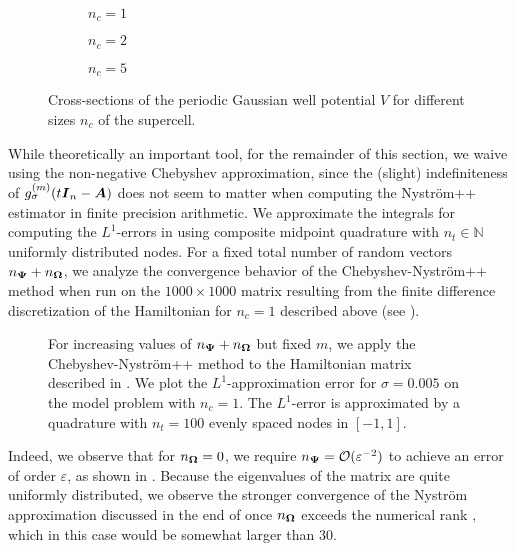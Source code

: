 \begin{figure}[ht]
    \begin{subfigure}[b]{0.32\columnwidth}
        
        \caption{$n_c=1$}
        \label{fig:gaussian-well-1}
    \end{subfigure}
    \begin{subfigure}[b]{0.32\columnwidth}
        
        \caption{$n_c=2$}
        \label{fig:gaussian-well-2}
    \end{subfigure}
    \begin{subfigure}[b]{0.32\columnwidth}
        
        \caption{$n_c=5$}
        \label{fig:gaussian-well-5}
    \end{subfigure}
    \caption{Cross-sections of the periodic Gaussian well potential $V$ for different sizes $n_c$ of the supercell.}
    \label{fig:gaussian-well}
\end{figure}

While theoretically an important tool, for the remainder of this section, we waive using the non-negative Chebyshev approximation, since the (slight) indefiniteness of $g_{\sigma}^{(m)}(t \boldsymbol{I}_n - \boldsymbol{A})$  does not seem to matter when computing the Nyström++ estimator in finite precision arithmetic. We approximate the integrals for computing the $L^1$-errors in  using composite midpoint quadrature with $n_t \in \mathbb{N}$ uniformly distributed nodes. For a fixed total number of random vectors $n_{\boldsymbol{\Psi}} + n_{\boldsymbol{\Omega}}$, we analyze the convergence behavior of the Chebyshev-Nyström++ method when run on the $1000 \times 1000$ matrix resulting from the finite difference discretization of the Hamiltonian for $n_c = 1$ described above (see ). 

\begin{figure}[!htpb]
    \centering
    
    \caption{For increasing values of $n_{\boldsymbol{\Psi}} + n_{\boldsymbol{\Omega}}$ but fixed $m$, we apply the Chebyshev-Nyström++ method to the Hamiltonian matrix described in . We plot the $L^1$-approximation error for $\sigma=0.005$ on the model problem with $n_c = 1$. The $L^1$-error is approximated by a quadrature with $n_t = 100$ evenly spaced nodes in $[-1, 1]$.}
    \label{fig:convergence}
\end{figure}

Indeed, we observe that for $n_{\boldsymbol{\Omega}} = 0$, we require $n_{\boldsymbol{\Psi}} = \mathcal{O}(\varepsilon^{-2})$ to achieve an error of order $\varepsilon$, as shown in . Because the eigenvalues of the matrix are quite uniformly distributed, we observe the stronger convergence of the Nyström approximation discussed in the end of  once $n_{\boldsymbol{\Omega}}$ exceeds the numerical rank , which in this case would be somewhat larger than $30$.

